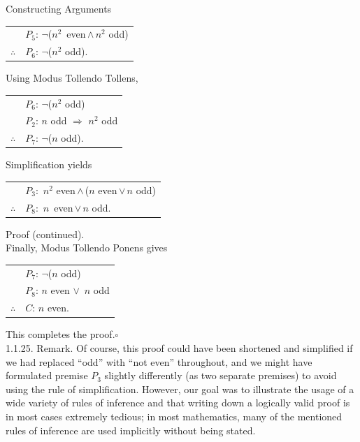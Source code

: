 \documentclass[smaller,hyperref={CJKbookmarks=true}]{beamer}
\begin{document}
\begin{frame}{Constructing Arguments}
\begin{spacing}{1.05}
\begin{center}
\begin{tabular}{cl}
    & $P_5\!:\,\neg$($n^2$~even\,$\wedge$\,$n^2$ odd) \\
     \cmidrule{2-2}
   $\therefore$ & $P_6\!:\,\neg$($n^2$ odd). \\
 \end{tabular}
\end{center}
Using Modus Tollendo Tollens,
\begin{center}
  \begin{tabular}{cl}
    & $P_6\!:\,\neg$($n^2$ odd) \\
    & $P_2\!:\,n$ odd $\Rightarrow$ $n^2$ odd \\
     \cmidrule{2-2}
   $\therefore$ & $P_7\!:\,\neg$($n$ odd). \\
 \end{tabular}
\end{center}
Simplification yields
\begin{center}
  \begin{tabular}{cl}
    & $P_3$:~$n^2$ even\,$\wedge$\,($n$ even\,$\vee$\,$n$ odd) \\
     \cmidrule{2-2}
   $\therefore$ & $P_8$:~$n$~even\,$\vee$\,$n$ odd. \\
 \end{tabular}
\end{center}
\newpage
\alert{Proof (continued).}\\
Finally, Modus Tollendo Ponens gives
\begin{center}
  \begin{tabular}{cl}
    & $P_7\!:\,\neg$($n$ odd) \\
    & $P_8\!:\,n$ even $\vee$~$n$ odd \\
     \cmidrule{2-2}
   $\therefore$ & $C\!:\,n$ even. \\
 \end{tabular}
\end{center}
This completes the proof.\quad$\square$\\[3pt]
\alert{1.1.25. Remark.} Of course, this proof could have been shortened and
simplified if we had replaced ``odd'' with ``not even'' throughout, and we
might have formulated premise $P_3$ slightly differently (as two separate
premises) to avoid using the rule of simplification. However, our goal was
to illustrate the usage of a wide variety of rules of inference and that
writing down a logically valid proof is in most cases extremely tedious; in
most mathematics, many of the mentioned rules of inference are used
implicitly without being stated.
\end{spacing}
\end{frame}
\end{document}
